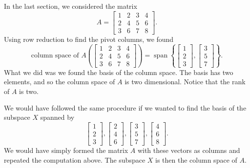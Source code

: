 \begin{example}
In the last section, we considered the matrix
\begin{equation*}
A =
\begin{bmatrix}
1 & 2 & 3 & 4 \\
2 & 4 & 5 & 6 \\
3 & 6 & 7 & 8
\end{bmatrix} .
\end{equation*}
Using row reduction to find the pivot columns, we found
\begin{equation*}
\text{column space of $A$} \left(
\begin{bmatrix}
1 & 2 & 3 & 4 \\
2 & 4 & 5 & 6 \\
3 & 6 & 7 & 8
\end{bmatrix} 
\right)
=
\operatorname{span}
\left\{
\begin{bmatrix}
1 \\
2 \\
3 
\end{bmatrix} 
,
\begin{bmatrix}
3 \\
5 \\
7 
\end{bmatrix} 
\right\} .
\end{equation*}
What we did was we found the basis of the column space.
The basis has two elements, and so the column space of $A$ is two dimensional.
Notice that the rank of $A$ is two.
\end{example}

We would have followed the same procedure if we wanted to find the basis of
the subspace $X$ spanned by
\begin{equation*}
\begin{bmatrix}
1 \\
2 \\
3 
\end{bmatrix} 
,
\begin{bmatrix}
2 \\
4 \\
6 
\end{bmatrix} 
,
\begin{bmatrix}
3 \\
5 \\
7 
\end{bmatrix} 
,
\begin{bmatrix}
4 \\
6 \\
8 
\end{bmatrix}
.
\end{equation*}
We would have simply formed the matrix $A$ with these vectors as columns
and repeated the computation above.  The subspace $X$ is then the column space of
$A$.

